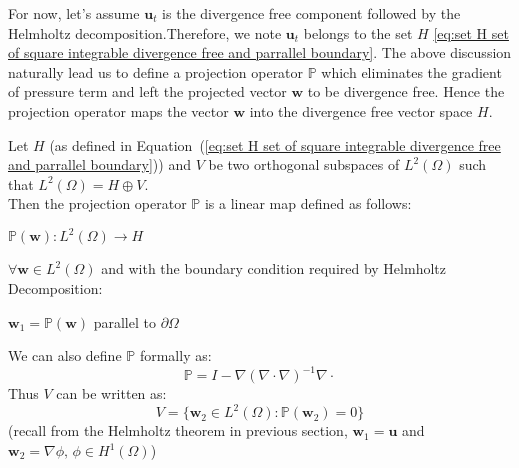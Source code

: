 For now, let's assume $\textbf{u}_t$ is the divergence free component followed by the Helmholtz decomposition.Therefore, we note $\textbf{u}_t$ belongs to the set $H$ \eqref{eq:set H set of square integrable divergence free and parrallel boundary}.
The above discussion naturally lead us to define a projection operator $\mathbb{P}$ which eliminates the gradient of pressure term and left the projected vector $\textbf{w}$ to be divergence free. Hence the projection operator maps the vector $\textbf{w}$ into the divergence free vector space $H$. 

\begin{mydef}
Let $\textit{H}$ (as defined in Equation~(\ref{eq:set H set of square integrable divergence free and parrallel boundary})) and $\textit{V}$ be two orthogonal subspaces of $\textit{L}^2 (\Omega)$ such that $\textit{L}^2 (\Omega) = \textit{H} \oplus \textit{V}$.\\

Then the projection operator $\mathbb{P}$ is a linear map defined as follows:
\begin{center}
$\mathbb{P} (\textbf{w}): \textit{L}^2 (\Omega) \rightarrow \textit{H}$\\
\end{center}
$\forall \textbf{w} \in \textit{L}^2 (\Omega)$ and with the boundary condition required by Helmholtz Decomposition:
\begin{center}
$\textbf{w}_1 = \mathbb{P} (\textbf{w})$ parallel to $\partial \Omega$
\end{center}
We can also define $\mathbb{P}$ formally as:
\begin{equation}\label{eq:definition of projection operator}
\mathbb{P} = I - \nabla (\nabla \cdot \nabla)^{-1} \nabla \cdot
\end{equation}
Thus $\textit{V}$ can be written as:
\begin{dmath*}\label{eq:set V}
V = \lbrace { \textbf{w}_2 \in \textit{L}^2 (\Omega): \mathbb{P} (\textbf{w}_2) = 0} \rbrace 
\end{dmath*}
(recall from the Helmholtz theorem in previous section, $\textbf{w}_1 = \textbf{u}$ and $\textbf{w}_2 = \nabla \phi,\,\phi \in H^1(\Omega)$)\\
\end{mydef}

